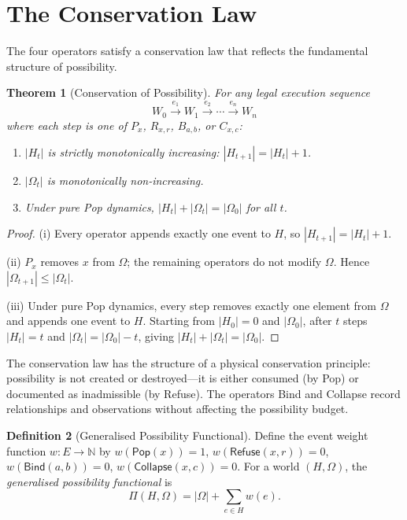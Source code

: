 \documentclass[12pt, a4paper, openany]{book}
\theoremstyle{plain}
\newtheorem{theorem}{Theorem}[chapter]
\theoremstyle{definition}
\newtheorem{definition}[theorem]{Definition}
\theoremstyle{remark}
\newcommand{\Pop}{\mathsf{Pop}}
\newcommand{\Refuse}{\mathsf{Refuse}}
\newcommand{\Bind}{\mathsf{Bind}}
\newcommand{\Collapse}{\mathsf{Collapse}}
\begin{document}
\section{The Conservation Law}

The four operators satisfy a conservation law that reflects the fundamental
structure of possibility.

\begin{theorem}[Conservation of Possibility]
\label{thm:conservation}
For any legal execution sequence
\[
W_0 \xrightarrow{e_1} W_1 \xrightarrow{e_2} \cdots \xrightarrow{e_n} W_n
\]
where each step is one of $P_x$, $R_{x,r}$, $B_{a,b}$, or $C_{x,c}$:
\begin{enumerate}
\item $|H_t|$ is strictly monotonically increasing: $|H_{t+1}| = |H_t| + 1$.
\item $|\Omega_t|$ is monotonically non-increasing.
\item Under pure Pop dynamics, $|H_t| + |\Omega_t| = |\Omega_0|$ for all $t$.
\end{enumerate}
\end{theorem}

\begin{proof}
(i) Every operator appends exactly one event to $H$, so $|H_{t+1}| = |H_t| + 1$.

(ii) $P_x$ removes $x$ from $\Omega$; the remaining operators do not modify
$\Omega$. Hence $|\Omega_{t+1}| \leq |\Omega_t|$.

(iii) Under pure Pop dynamics, every step removes exactly one element from $\Omega$
and appends one event to $H$. Starting from $|H_0| = 0$ and $|\Omega_0|$, after
$t$ steps $|H_t| = t$ and $|\Omega_t| = |\Omega_0| - t$, giving
$|H_t| + |\Omega_t| = |\Omega_0|$.
\end{proof}

The conservation law has the structure of a physical conservation principle:
possibility is not created or destroyed---it is either consumed (by Pop) or
documented as inadmissible (by Refuse). The operators Bind and Collapse record
relationships and observations without affecting the possibility budget.

\begin{definition}[Generalised Possibility Functional]
Define the event weight function $w : E \to \mathbb{N}$ by $w(\Pop(x)) = 1$,
$w(\Refuse(x,r)) = 0$, $w(\Bind(a,b)) = 0$, $w(\Collapse(x,c)) = 0$. For a
world $(H, \Omega)$, the \emph{generalised possibility functional} is
\[
\Pi(H, \Omega) = |\Omega| + \sum_{e \in H} w(e).
\]
\end{definition}
\end{document}
